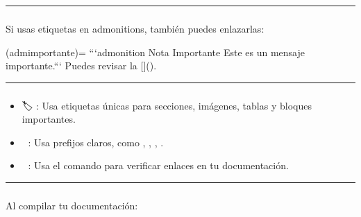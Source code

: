 \documentclass[a4paper,10pt,oneside,spanish,openany]{sphinxmanual}
\begin{document}
\bigskip\hrule\bigskip



\subsubsection{}
\label{\detokenize{configuracion_inicial/013.guia_de_myst_parser:referencias-a-admonitions}}
\sphinxAtStartPar
Si usas etiquetas en admonitions, también puedes enlazarlas:

\begin{sphinxVerbatim}[commandchars=\\\{\}]
(adm\PYGZhy{}importante)=
	```\PYGZob{}admonition\PYGZcb{} Nota Importante
	Este es un mensaje importante.```
Puedes revisar la []().
\end{sphinxVerbatim}


\bigskip\hrule\bigskip



\subsubsection{}
\label{\detokenize{configuracion_inicial/013.guia_de_myst_parser:buenas-practicas-para-referencias-cruzadas}}\begin{itemize}
\item {} 
\sphinxAtStartPar
🏷️ : Usa etiquetas únicas para secciones, imágenes, tablas y bloques importantes.

\item {} 
\sphinxAtStartPar
🔗 : Usa prefijos claros, como , , , .

\item {} 
\sphinxAtStartPar
📝 : Usa el comando  para verificar enlaces en tu documentación.

\end{itemize}


\bigskip\hrule\bigskip



\subsubsection{}
\label{\detokenize{configuracion_inicial/013.guia_de_myst_parser:verificar-referencias-cruzadas}}
\sphinxAtStartPar
Al compilar tu documentación:
\end{document}
